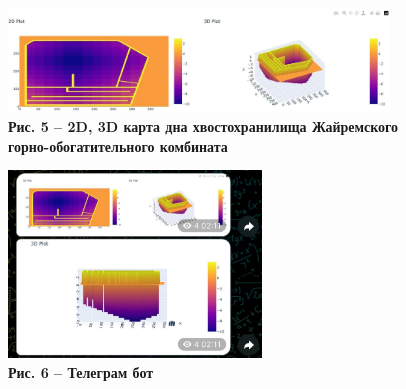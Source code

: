 \begin{figure}[H]
	\centering
	\includegraphics[height=0.4\textwidth, width=0.9\textwidth]{assets/212}
	\caption*{\bfseries Рис. 5 -- 2D, 3D карта дна хвостохранилища Жайремского
  горно-обогатительного комбината}
\end{figure}



\begin{figure}[H]
	\centering
	\includegraphics[width=0.6\textwidth]{assets/213}
	\caption*{\bfseries Рис. 6 -- Телеграм бот}
\end{figure}


